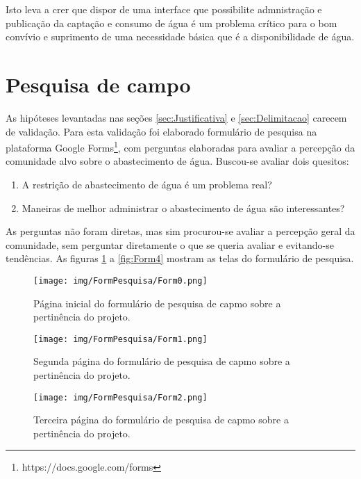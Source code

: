 Isto leva a crer que dispor de uma interface que possibilite admnistração e publicação da captação e consumo de água é um problema crítico para o bom convívio e suprimento de uma necessidade básica que é a disponibilidade de água.

\section{Pesquisa de campo}

As hipóteses levantadas nas seções \ref{sec:Justificativa} e \ref{sec:Delimitacao} carecem de validação. Para esta validação foi elaborado formulário de pesquisa na plataforma Google Forms\footnote{https://docs.google.com/forms}, com perguntas elaboradas para avaliar a percepção da comunidade alvo sobre o abastecimento de água. Buscou-se avaliar dois quesitos:
\begin{enumerate}
    \item A restrição de abastecimento de água é um problema real?
    \item Maneiras de melhor administrar o abastecimento de água são interessantes?
\end{enumerate}

As perguntas não foram diretas, mas sim procurou-se avaliar a percepção geral da comunidade, sem perguntar diretamente o que se queria avaliar e evitando-se tendências. As figuras \ref{fig:Form0} a \ref{fig:Form4} mostram as telas do formulário de pesquisa.

\begin{figure}[htbp!]
    \centering
    \suppressfloats[t]
    \texttt{[image: img/FormPesquisa/Form0.png]}
    \caption{Página inicial do formulário de pesquisa de capmo sobre a pertinência do projeto.}
    \label{fig:Form0}
\end{figure}

\begin{figure}[htbp!]
    \centering
    \suppressfloats[t]
    \texttt{[image: img/FormPesquisa/Form1.png]}
    \caption{Segunda página do formulário de pesquisa de capmo sobre a pertinência do projeto.}
    \label{fig:Form1}
\end{figure}

\begin{figure}[htbp!]
    \centering
    \suppressfloats[t]
    \texttt{[image: img/FormPesquisa/Form2.png]}
    \caption{Terceira página do formulário de pesquisa de capmo sobre a pertinência do projeto.}
    \label{fig:Form2}
\end{figure}


